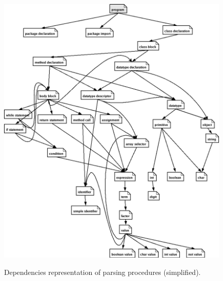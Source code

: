 \begin{figure}
	\begin{center}
	\includegraphics[scale=0.4]{Diagram_Small.png}
	
	\label{dep_diagram}
	\caption {Dependencies representation of parsing procedures (simplified).}
	\end{center}
\end{figure}
